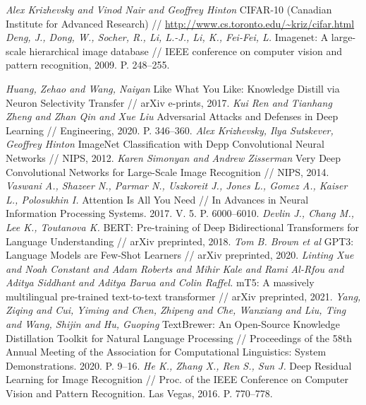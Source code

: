 \newpage


\begin{thebibliography}{10}
	\textit{Alex Krizhevsky and Vinod Nair and Geoffrey Hinton} CIFAR-10 (Canadian Institute for Advanced Research) // \url{http://www.cs.toronto.edu/~kriz/cifar.html}
	\textit{Deng, J., Dong, W., Socher, R., Li, L.-J., Li, K., Fei-Fei, L. } Imagenet: A large-scale hierarchical image database //  IEEE conference on computer vision and pattern recognition, 2009. P. 248--255. 
	
	\textit{{Huang}, Zehao and {Wang}, Naiyan} Like What You Like: Knowledge Distill via Neuron Selectivity Transfer // arXiv e-prints, 2017.
	\textit{Kui Ren and Tianhang Zheng and Zhan Qin and Xue Liu} Adversarial Attacks and Defenses in Deep Learning // Engineering, 2020. P. 346--360.
	\textit{Alex Krizhevsky, Ilya Sutskever, Geoffrey Hinton} ImageNet Classification with Depp Convolutional Neural Networks // NIPS, 2012.
	\textit{Karen Simonyan and Andrew Zisserman} Very Deep Convolutional Networks for Large-Scale Image Recognition // NIPS, 2014.
	\textit{Vaswani A., Shazeer N., Parmar N., Uszkoreit J., Jones L., Gomez A., Kaiser L., Polosukhin I.} Attention Is All You Need // In Advances in Neural Information Processing Systems. 2017. V. 5. P. 6000--6010.
       \textit{Devlin J., Chang M., Lee K., Toutanova K.} BERT: Pre-training of Deep Bidirectional Transformers for Language Understanding // arXiv preprinted, 2018.
        \textit{Tom B. Brown et al} GPT3: Language Models are Few-Shot Learners // arXiv preprinted, 2020.
        \textit{Linting Xue and Noah Constant and Adam Roberts and Mihir Kale and Rami Al-Rfou and Aditya Siddhant and Aditya Barua and Colin Raffel.} mT5: A massively multilingual pre-trained text-to-text transformer // arXiv preprinted, 2021.
        \textit{Yang, Ziqing and Cui, Yiming and Chen, Zhipeng and Che, Wanxiang and Liu, Ting and Wang, Shijin and Hu, Guoping} {T}ext{B}rewer: {A}n {O}pen-{S}ource {K}nowledge {D}istillation {T}oolkit for {N}atural {L}anguage {P}rocessing // Proceedings of the 58th Annual Meeting of the Association for Computational Linguistics: System Demonstrations.  2020. P. 9--16.
	\textit{He K., Zhang X., Ren S., Sun J.} Deep Residual Learning for Image Recognition // Proc. of the IEEE Conference on Computer Vision and Pattern Recognition. Las Vegas, 2016. P. 770--778.

\end{thebibliography}
